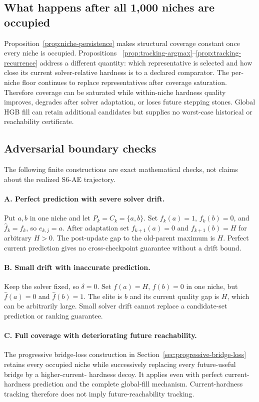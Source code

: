 \subsection{What happens after all 1,000 niches are occupied}
Proposition~\ref{prop:niche-persistence} makes structural coverage constant
once every niche is occupied.  Propositions
~\ref{prop:tracking-argmax}--\ref{prop:tracking-recurrence} address a different
quantity: which representative is selected and how close its current
solver-relative hardness is to a declared comparator.  The per-niche floor
continues to replace representatives after coverage saturation.  Therefore
coverage can be saturated while within-niche hardness quality improves,
degrades after solver adaptation, or loses future stepping stones.  Global
HGB fill can retain additional candidates but supplies no worst-case
historical or reachability certificate.

\subsection{Adversarial boundary checks}
The following finite constructions are exact mathematical checks, not claims
about the realized S6-AE trajectory.

\paragraph{A. Perfect prediction with severe solver drift.}
Put $a,b$ in one niche and let $P_k=C_k=\{a,b\}$.  Set
$f_k(a)=1$, $f_k(b)=0$, and $\widehat f_k=f_k$, so $e_{k,j}=a$.  After
adaptation set $f_{k+1}(a)=0$ and $f_{k+1}(b)=H$ for arbitrary $H>0$.
The post-update gap to the old-parent maximum is $H$.  Perfect current
prediction gives no cross-checkpoint guarantee without a drift bound.

\paragraph{B. Small drift with inaccurate prediction.}
Keep the solver fixed, so $\delta=0$.  Set $f(a)=H$, $f(b)=0$ in one niche,
but $\widehat f(a)=0$ and $\widehat f(b)=1$.  The elite is $b$ and its current
quality gap is $H$, which can be arbitrarily large.  Small solver drift cannot
replace a candidate-set prediction or ranking guarantee.

\paragraph{C. Full coverage with deteriorating future reachability.}
The progressive bridge-loss construction in
Section~\ref{sec:progressive-bridge-loss} retains every occupied niche while
successively replacing every future-useful bridge by a higher-current-
hardness decoy.  It applies even with perfect current-hardness prediction and
the complete global-fill mechanism.  Current-hardness tracking therefore does
not imply future-reachability tracking.

